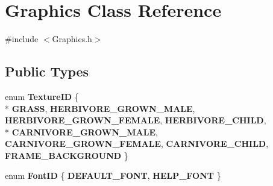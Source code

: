 \hypertarget{class_graphics}{}\section{Graphics Class Reference}
\label{class_graphics}


{\ttfamily \#include $<$Graphics.\+h$>$}

\subsection*{Public Types}
\begin{DoxyCompactItemize}
\item 
\hypertarget{class_graphics_ab2279e168182f0b7e06e2f8383c5c388}{}enum {\bfseries Texture\+I\+D} \{ \\*
{\bfseries G\+R\+A\+S\+S}, 
{\bfseries H\+E\+R\+B\+I\+V\+O\+R\+E\+\_\+\+G\+R\+O\+W\+N\+\_\+\+M\+A\+L\+E}, 
{\bfseries H\+E\+R\+B\+I\+V\+O\+R\+E\+\_\+\+G\+R\+O\+W\+N\+\_\+\+F\+E\+M\+A\+L\+E}, 
{\bfseries H\+E\+R\+B\+I\+V\+O\+R\+E\+\_\+\+C\+H\+I\+L\+D}, 
\\*
{\bfseries C\+A\+R\+N\+I\+V\+O\+R\+E\+\_\+\+G\+R\+O\+W\+N\+\_\+\+M\+A\+L\+E}, 
{\bfseries C\+A\+R\+N\+I\+V\+O\+R\+E\+\_\+\+G\+R\+O\+W\+N\+\_\+\+F\+E\+M\+A\+L\+E}, 
{\bfseries C\+A\+R\+N\+I\+V\+O\+R\+E\+\_\+\+C\+H\+I\+L\+D}, 
{\bfseries F\+R\+A\+M\+E\+\_\+\+B\+A\+C\+K\+G\+R\+O\+U\+N\+D}
 \}\label{class_graphics_ab2279e168182f0b7e06e2f8383c5c388}

\item 
\hypertarget{class_graphics_a1213342a76f91e6b4062b80c7ccbcd22}{}enum {\bfseries Font\+I\+D} \{ {\bfseries D\+E\+F\+A\+U\+L\+T\+\_\+\+F\+O\+N\+T}, 
{\bfseries H\+E\+L\+P\+\_\+\+F\+O\+N\+T}
 \}\label{class_graphics_a1213342a76f91e6b4062b80c7ccbcd22}

\end{DoxyCompactItemize}
